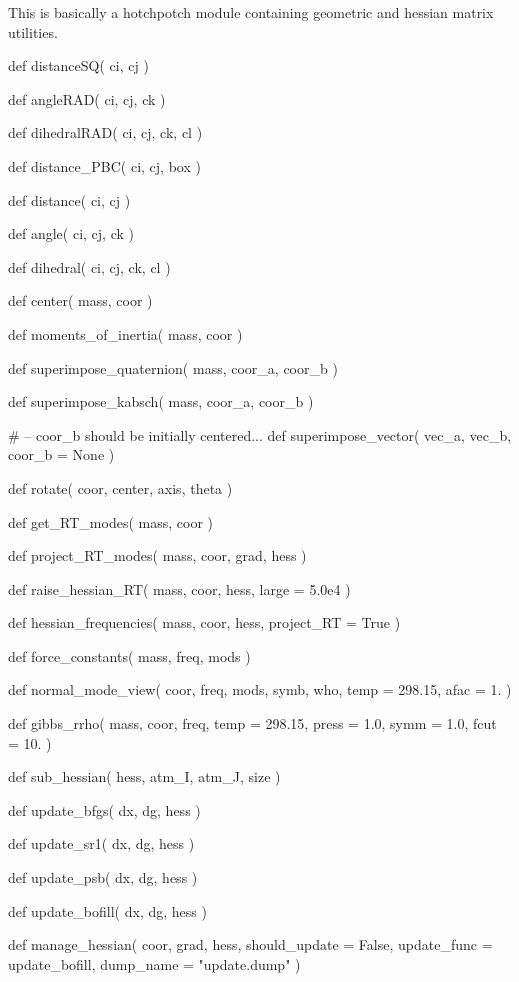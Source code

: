 \normalsize
This is basically a hotchpotch module containing geometric and hessian matrix utilities. 
\begin{pyglist}[language=python,fvset={frame=single}]
def distanceSQ( ci, cj )

def angleRAD( ci, cj, ck )

def dihedralRAD( ci, cj, ck, cl )

def distance_PBC( ci, cj, box )

def distance( ci, cj )

def angle( ci, cj, ck )

def dihedral( ci, cj, ck, cl )

def center( mass, coor )

def moments_of_inertia( mass, coor )

def superimpose_quaternion( mass, coor_a, coor_b )

def superimpose_kabsch( mass, coor_a, coor_b )

# -- coor_b should be initially centered...
def superimpose_vector( vec_a, vec_b, coor_b = None )

def rotate( coor, center, axis, theta )

def get_RT_modes( mass, coor )

def project_RT_modes( mass, coor, grad, hess )

def raise_hessian_RT( mass, coor, hess, large = 5.0e4 )

def hessian_frequencies( mass, coor, hess, project_RT = True )

def force_constants( mass, freq, mods )

def normal_mode_view( coor, freq, mods, symb, who, temp = 298.15, afac = 1. )

def gibbs_rrho( mass, coor, freq, temp = 298.15, press = 1.0, symm = 1.0, fcut = 10. )

def sub_hessian( hess, atm_I, atm_J, size )

def update_bfgs( dx, dg, hess )

def update_sr1( dx, dg, hess )

def update_psb( dx, dg, hess )

def update_bofill( dx, dg, hess )

def manage_hessian( coor, grad, hess, should_update = False, update_func = update_bofill,
    dump_name = "update.dump" )
\end{pyglist}
